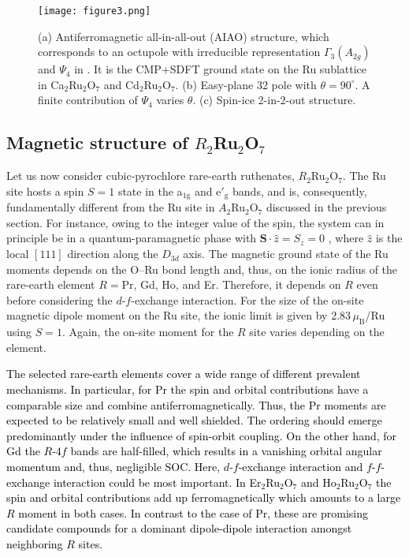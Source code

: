\documentclass[10pt]{iopart}
\newcommand{\mub}{\,\mu_\text{B}}
\newcommand{\red}[1]{\textcolor{black}{#1}}
\begin{document}
\begin{figure}
  \texttt{[image: figure3.png]}
  \caption{(a) Antiferromagnetic all-in-all-out (AIAO) structure, which corresponds to an octupole with irreducible representation $\Gamma_3(A_{2g})$ and $\Psi_4$ in . It is the CMP+SDFT ground state on the Ru sublattice in Ca$_2$Ru$_2$O$_7$ and Cd$_2$Ru$_2$O$_7$. (b) Easy-plane 32 pole with $\theta=90^{\circ}$. A finite contribution of $\Psi_{4}$ varies $\theta$. (c) Spin-ice 2-in-2-out structure.
  \label{fig:3}
  }
\end{figure}

\subsection{Magnetic structure of \texorpdfstring{$R_2$Ru$_2$O$_7$}{R2Ru2O7}} \label{subsec:Magnetic structure R}

Let us now consider cubic-pyrochlore rare-earth ruthenates, $R_2$Ru$_2$O$_7$. The Ru site hosts a spin $S=1$ state in the a$_\mathrm{1g}$ and e$'_\mathrm{g}$ bands, and is, consequently, fundamentally different from the Ru site in $A_2$Ru$_2$O$_7$ discussed in the previous section. For instance, owing to the integer value of the spin, the system can in principle be in a quantum-paramagnetic phase with $\mathbf{S} \cdot \hat{z} = S_z = 0$ \cite{li2018competing}, where $\hat{z}$ is the local $[111]$ direction along the $D_{3d}$ axis. The magnetic ground state of the Ru moments depends on the O--Ru bond length and, thus, on the ionic radius of the rare-earth element $R=$Pr, Gd, Ho, and Er. Therefore, it depends on $R$ even before considering the $d$-$f$-exchange interaction. For the size of the on-site magnetic dipole moment on the Ru site, the ionic limit is given by $2.83\mub$/Ru using $S=1$. Again, the on-site moment for the $R$ site varies depending on the element.

\red{The selected rare-earth elements cover a wide range of different prevalent mechanisms. In particular, for Pr the spin and orbital contributions have a comparable size and combine antiferromagnetically. Thus, the Pr moments are expected to be relatively small and well shielded. The ordering should emerge predominantly under the influence of spin-orbit coupling. On the other hand, for Gd the $R$-$4f$ bands are half-filled, which results in a vanishing orbital angular momentum and, thus, negligible SOC. Here, $d$-$f$-exchange interaction and $f$-$f$-exchange interaction could be most important. In Er$_2$Ru$_2$O$_7$ and Ho$_2$Ru$_2$O$_7$ the spin and orbital contributions add up ferromagnetically which amounts to a large $R$ moment in both cases. In contrast to the case of Pr, these are promising candidate compounds for a dominant dipole-dipole interaction amongst neighboring $R$ sites.}
\end{document}

